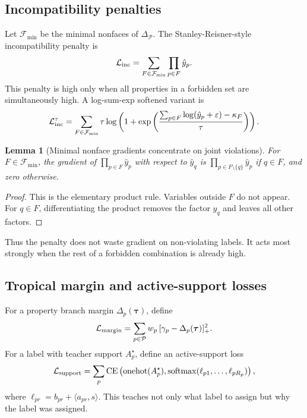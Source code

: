 \documentclass[11pt]{article}
\newtheorem{lemma}[theorem]{Lemma}
\theoremstyle{definition}
\theoremstyle{remark}
\newcommand{\CE}{\operatorname{CE}}
\newcommand{\loss}{\mathcal{L}}
\newcommand{\eps}{\varepsilon}
\newcommand{\traj}{\boldsymbol{\tau}}
\newcommand{\Prop}{\mathcal{P}}
\numberwithin{equation}{section}
\begin{document}
\subsection{Incompatibility penalties}

Let \(\mathcal F_{\min}\) be the minimal nonfaces of \(\Delta_\Prop\).  The Stanley-Reisner-style incompatibility penalty is
\begin{equation}
    \loss_{\rm inc}=\sum_{F\in\mathcal F_{\min}}\prod_{p\in F}\hat y_p.
\end{equation}
This penalty is high only when all properties in a forbidden set are simultaneously high.  A log-sum-exp softened variant is
\begin{equation}
    \loss_{\rm inc}^{\tau}=\sum_{F\in\mathcal F_{\min}}\tau\log\left(1+\exp\left(\frac{\sum_{p\in F}\log(\hat y_p+\eps)-\kappa_F}{\tau}\right)\right).
\end{equation}

\begin{lemma}[Minimal nonface gradients concentrate on joint violations]
For \(F\in\mathcal F_{\min}\), the gradient of \(\prod_{p\in F}\hat y_p\) with respect to \(\hat y_q\) is \(\prod_{p\in F\setminus\{q\}}\hat y_p\) if \(q\in F\), and zero otherwise.
\end{lemma}
\begin{proof}
This is the elementary product rule.  Variables outside \(F\) do not appear.  For \(q\in F\), differentiating the product removes the factor \(\hat y_q\) and leaves all other factors.
\end{proof}

Thus the penalty does not waste gradient on non-violating labels.  It acts most strongly when the rest of a forbidden combination is already high.

\subsection{Tropical margin and active-support losses}

For a property branch margin \(\Delta_p(\traj)\), define
\begin{equation}
    \loss_{\rm margin}=\sum_{p\in\Prop} w_p\,[\gamma_p-\Delta_p(\traj)]_+^2.
\end{equation}
For a label with teacher support \(A_p^\star\), define an active-support loss
\begin{equation}
    \loss_{\rm support}=\sum_p \CE\left(\operatorname{onehot}(A_p^\star),\operatorname{softmax}(\ell_{p1},\ldots,\ell_{pR_p})\right),
\end{equation}
where \(\ell_{pr}=b_{pr}+\langle a_{pr},s\rangle\).  This teaches not only what label to assign but why the label was assigned.
\end{document}
